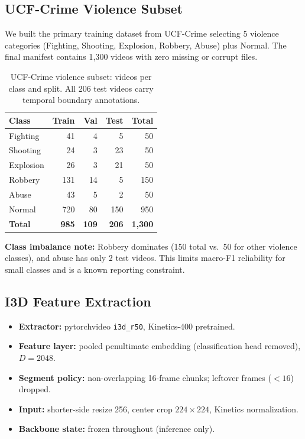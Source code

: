 \documentclass[11pt]{article}
\begin{document}
\subsection{UCF-Crime Violence Subset}
We built the primary training dataset from UCF-Crime selecting 5 violence categories (Fighting, Shooting, Explosion, Robbery, Abuse) plus Normal. The final manifest contains 1,300 videos with zero missing or corrupt files.

\begin{table}[h]
\centering
\small
\begin{tabular}{lrrrr}
\toprule
\textbf{Class} & \textbf{Train} & \textbf{Val} & \textbf{Test} & \textbf{Total} \\
\midrule
Fighting   &  41 &  4 &  5 &   50 \\
Shooting   &  24 &  3 & 23 &   50 \\
Explosion  &  26 &  3 & 21 &   50 \\
Robbery    & 131 & 14 &  5 &  150 \\
Abuse      &  43 &  5 &  2 &   50 \\
Normal     & 720 & 80 & 150 &  950 \\
\midrule
\textbf{Total} & \textbf{985} & \textbf{109} & \textbf{206} & \textbf{1,300} \\
\bottomrule
\end{tabular}
\caption{UCF-Crime violence subset: videos per class and split. All 206 test videos carry temporal boundary annotations.}
\label{tab:dataset_splits}
\end{table}

\textbf{Class imbalance note:} Robbery dominates (150 total vs.\ 50 for other violence classes), and abuse has only 2 test videos. This limits macro-F1 reliability for small classes and is a known reporting constraint.

\subsection{I3D Feature Extraction}

\begin{itemize}
\item \textbf{Extractor:} pytorchvideo \texttt{i3d\_r50}, Kinetics-400 pretrained.
\item \textbf{Feature layer:} pooled penultimate embedding (classification head removed), $D = 2048$.
\item \textbf{Segment policy:} non-overlapping 16-frame chunks; leftover frames ($< 16$) dropped.
\item \textbf{Input:} shorter-side resize 256, center crop $224\!\times\!224$, Kinetics normalization.
\item \textbf{Backbone state:} frozen throughout (inference only).
\end{itemize}
\end{document}
